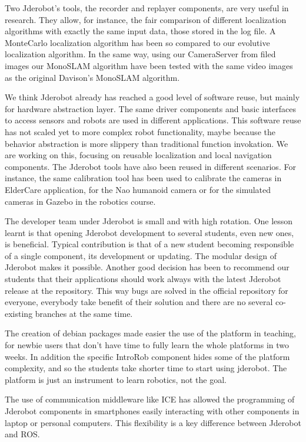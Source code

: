 \documentclass[twocolumn]{svjour3}          %
\begin{document}
Two Jderobot's tools, the recorder and replayer components, are very useful in research. They allow, for instance, the fair comparison of different localization algorithms with exactly the same input data, those stored in the log file. A MonteCarlo localization algorithm has been so compared to our evolutive localization algorithm. In the same way, using our CameraServer from filed images our MonoSLAM algorithm have been tested with the same video images as the original Davison's MonoSLAM algorithm.

We think Jderobot already has reached a good level of software reuse, but mainly for hardware abstraction layer. The same driver components and basic interfaces to access sensors and robots are used in different applications. This software reuse has not scaled yet to more complex robot functionality, maybe because the behavior abstraction is more slippery than traditional function invokation. We are working on this, focusing on reusable localization and local navigation components. The Jderobot tools have also been reused in different scenarios. For instance, the same calibration tool has been used to calibrate the cameras in ElderCare application, for the Nao humanoid camera or for the simulated cameras in Gazebo in the robotics course.

The developer team under Jderobot is small and with high rotation. One lesson learnt is that opening Jderobot development to several students, even new ones, is beneficial. Typical contribution is that of a new student becoming responsible of a single component, its development or updating. The modular design of Jderobot makes it possible. Another good decision has been to recommend our students that their applications should work always with the latest Jderobot release at the repository. This way bugs are solved in the official repository for everyone, everybody take benefit of their solution and there are no several co-existing branches at the same time.

The creation of debian packages made easier the use of the platform in teaching, for newbie users that don't have time to fully learn the whole platforms in two weeks. In addition the specific IntroRob component hides some of the platform complexity, and so the students take shorter time to start using jderobot. The platform is just an instrument to learn robotics, not the goal.

The use of communication middleware like ICE has allowed the programming of Jderobot components in smartphones easily interacting with other components in laptop or personal computers. This flexibility is a key difference between Jderobot and ROS. 
\end{document}
